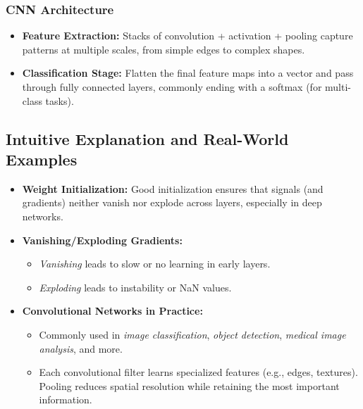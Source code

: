 \documentclass{article}
\begin{document}
\subsubsection{CNN Architecture}
\begin{itemize}
    \item \textbf{Feature Extraction:} Stacks of convolution + activation + pooling capture patterns at multiple scales, from simple edges to complex shapes.
    \item \textbf{Classification Stage:} Flatten the final feature maps into a vector and pass through fully connected layers, commonly ending with a softmax (for multi-class tasks).
\end{itemize}

\subsection{Intuitive Explanation and Real-World Examples}
\begin{itemize}
    \item \textbf{Weight Initialization:} Good initialization ensures that signals (and gradients) neither vanish nor explode across layers, especially in deep networks.
    \item \textbf{Vanishing/Exploding Gradients:} 
    \begin{itemize}
        \item \textit{Vanishing} leads to slow or no learning in early layers. 
        \item \textit{Exploding} leads to instability or NaN values.
    \end{itemize}
    \item \textbf{Convolutional Networks in Practice:}
    \begin{itemize}
        \item Commonly used in \textit{image classification}, \textit{object detection}, \textit{medical image analysis}, and more.
        \item Each convolutional filter learns specialized features (e.g., edges, textures). Pooling reduces spatial resolution while retaining the most important information.
    \end{itemize}
\end{itemize}
\end{document}
